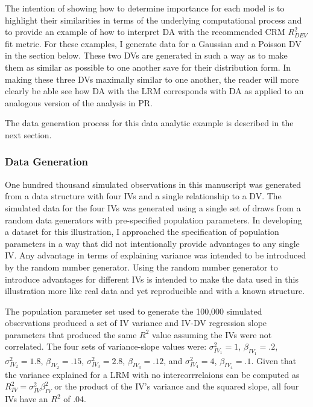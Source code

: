 \documentclass[ShortAfour,times,sageapa]{sagej}
\begin{document}
	The intention of showing how to determine importance for each model is to highlight their similarities in terms of the underlying computational process and to provide an example of how to interpret DA with the recommended CRM $R^2_{DEV}$ fit metric.
	For these examples, I generate data for a Gaussian and a Poisson DV in the section below.
	These two DVs are generated in such a way as to make them as similar as possible to one another save for their distribution form.
	In making these three DVs maximally similar to one another, the reader will more clearly be able see how DA with the LRM corresponds with DA as applied to an analogous version of the analysis in PR.
	
	The data generation process for this data analytic example is described in the next section.
	
		\subsubsection{Data Generation}
		
	One hundred thousand simulated observations in this manuscript was generated from a data structure with four IVs and a single relationship to a DV.
	The simulated data for the four IVs was generated using a single set of draws from a random data generators with pre-specified population parameters.
	In developing a dataset for this illustration, I approached the specification of population parameters in a way that did not intentionally provide advantages to any single IV.  
	Any advantage in terms of explaining variance was intended to be introduced by the random number generator.
	Using the random number generator to introduce advantages for different IVs is intended to make the data used in this illustration more like real data and yet reproducible and with a known structure.
	
	The population parameter set used to generate the 100,000 simulated observations produced a set of IV variance and IV-DV regression slope parameters that produced the same $R^2$ value assuming the IVs were not correlated.  The four sets of variance-slope values were: $\sigma^2_{IV_1} = 1$, $\beta_{IV_1} =.2$, $\sigma^2_{IV_2} = 1.8$, $\beta_{IV_2} =.15$, $\sigma^2_{IV_3} = 2.8$, $\beta_{IV_3} =.12$, and $\sigma^2_{IV_4} = 4$, $\beta_{IV_4} =.1$. 
	Given that the variance explained for a LRM with no intercorrrelaions can be computed as $R^2_{IV} = \sigma^2_{IV}\beta^2_{IV}$ or the product of the IV's variance and the squared slope, all four IVs have an $R^2$ of .04.
	
\end{document}
